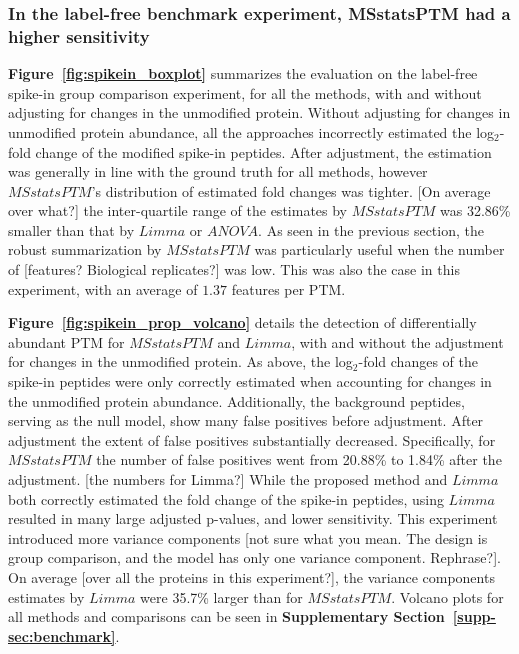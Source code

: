 \documentclass[mcp]{article}
\numberwithin{table}{section}
\def\todo#1{{\color{red}[#1]}}
\def\figref#1{{\bf Figure~\ref{fig:#1}}}
\begin{document}
\subsubsection*{In the label-free benchmark experiment, MSstatsPTM had a higher sensitivity}

\figref{spikein_boxplot} summarizes the evaluation on the label-free spike-in group comparison experiment, for all the methods, with and without adjusting for changes in the unmodified protein. 
Without adjusting for changes in unmodified protein abundance, all the approaches incorrectly estimated the log$_2$-fold change of the modified spike-in peptides.
After adjustment, the estimation was generally in line with the ground truth for all methods, however $MSstatsPTM$'s distribution of estimated fold changes was tighter. 
\todo{On average over what?} the inter-quartile range of the estimates by $MSstatsPTM$ was 32.86\% smaller than that by $Limma$ or $ANOVA$. 
As seen in the previous section, the robust summarization by $MSstatsPTM$ was particularly useful when the number of \todo{features? Biological replicates?} was low. 
This was also the case in this experiment, with an average of $1.37$ features per PTM.

\figref{spikein_prop_volcano} details the detection of differentially abundant PTM for $MSstatsPTM$ and $Limma$, with and without the adjustment for changes in the unmodified protein.
As above, the log$_2$-fold changes of the spike-in peptides were only correctly estimated when accounting for changes in the unmodified protein abundance. 
Additionally, the background peptides, serving as the null model, show many false positives before adjustment. 
After adjustment the extent of false positives substantially decreased. 
Specifically, for $MSstatsPTM$ the number of false positives went from 20.88\% to 1.84\% after the adjustment. \todo{the numbers for Limma?} 
While the proposed method and $Limma$ both correctly estimated the fold change of the spike-in peptides, using $Limma$ resulted in many large adjusted p-values, and lower sensitivity. 
This experiment introduced more variance components \todo{not sure what you mean. The design is group comparison, and the model has only one variance component. Rephrase?}. 
On average \todo{over all the proteins in this experiment?}, the variance components estimates by $Limma$ were 35.7\% larger than for $MSstatsPTM$. Volcano plots for all methods and comparisons can be seen in {\bf Supplementary Section~\ref{supp-sec:benchmark}}.
\end{document}

